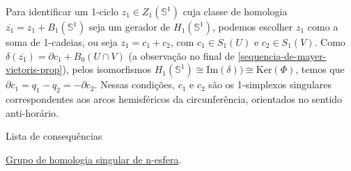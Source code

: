 Para identificar um 1-ciclo $z_1\in Z_1(\mathbb{S}^1)$ cuja classe de homologia $\overline{z_1}=z_1+B_1 (\mathbb{S}^1)$ seja um gerador de $H_1(\mathbb{S}^1)$, podemos escolher $z_1$ como a soma de 1-cadeias, ou seja $z_1=c_1+c_2$, com $c_1\in S_1(U)$ e $c_2\in S_1(V)$. Como $\delta(\overline{z_1})=\partial c_1+B_0(U\cap V)$ (a observação no final de \ref{sequencia-de-mayer-vietoris-prop}), pelos isomorfismos $H_1(\mathbb{S}^1)\cong\text{Im}(\delta))\cong \text{Ker}(\Phi)$, temos que $\partial c_1=q_1-q_2=-\partial c_2$. Nessas condições, $c_1$ e $c_2$ são os 1-simplexos singulares correspondentes aos arcos hemisféricos da circunferência, orientados no sentido anti-horário.

\begin{titlemize}{Lista de consequências}
    \item \hyperref[grupo-de-homologia-singular-de-n-esfera-prop]{Grupo de homologia singular de n-esfera}.\\
\end{titlemize}

